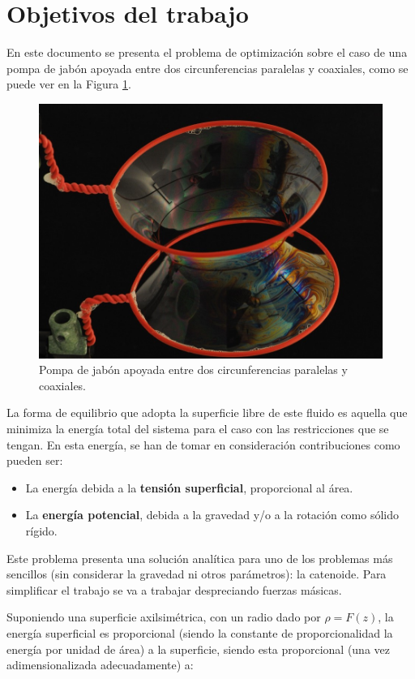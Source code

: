 \section{Objetivos del trabajo} 

En este documento se presenta el problema de optimización sobre el caso de una pompa de jabón apoyada entre dos circunferencias paralelas y coaxiales, como se puede ver en la Figura \ref{fig:pompa_fisica}.

\begin{figure}[h]
    \centering
    \includegraphics[width = 0.5 \linewidth]{Figures/01/soap_film.jpg}
    \caption{Pompa de jabón apoyada entre dos circunferencias paralelas y coaxiales.}
    \label{fig:pompa_fisica}
\end{figure}

La forma de equilibrio que adopta la superficie libre de este fluido es aquella que minimiza la energía total del sistema para el caso con las restricciones que se tengan. En esta energía, se han de tomar en consideración contribuciones como pueden ser:

\begin{itemize}
\item La energía debida a la \textbf{tensión superficial}, proporcional al área.
\item La \textbf{energía potencial}, debida a la gravedad y/o a la rotación como sólido rígido.
\end{itemize}

Este problema presenta una solución analítica para uno de los problemas más sencillos (sin considerar la gravedad ni otros parámetros): la catenoide. Para simplificar el trabajo se va a trabajar despreciando fuerzas másicas.

Suponiendo una superficie axilsimétrica, con un radio dado por
\(\rho=F(z)\), la energía superficial es proporcional (siendo la
constante de proporcionalidad la energía por unidad de área) a la
superficie, siendo esta proporcional (una vez adimensionalizada
adecuadamente) a:

